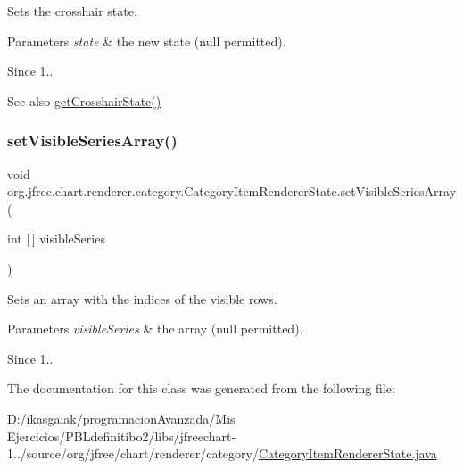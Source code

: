 Sets the crosshair state.


\begin{DoxyParams}{Parameters}
{\em state} & the new state ({\ttfamily null} permitted).\\
\hline
\end{DoxyParams}
\begin{DoxySince}{Since}
1..
\end{DoxySince}
\begin{DoxySeeAlso}{See also}
\mbox{\hyperlink{classorg_1_1jfree_1_1chart_1_1renderer_1_1category_1_1_category_item_renderer_state_a1643863db46b2b247a24e7d297b512e1}{get\+Crosshair\+State()}} 
\end{DoxySeeAlso}
\mbox{\label{classorg_1_1jfree_1_1chart_1_1renderer_1_1category_1_1_category_item_renderer_state_a2d5383dca6367b725a2de2c0f18c8fa3}} 
\subsubsection{\texorpdfstring{set\+Visible\+Series\+Array()}{setVisibleSeriesArray()}}
{\footnotesize\ttfamily void org.\+jfree.\+chart.\+renderer.\+category.\+Category\+Item\+Renderer\+State.\+set\+Visible\+Series\+Array (\begin{DoxyParamCaption}\item[{int \mbox{[}$\,$\mbox{]}}]{visible\+Series }\end{DoxyParamCaption})}

Sets an array with the indices of the visible rows.


\begin{DoxyParams}{Parameters}
{\em visible\+Series} & the array ({\ttfamily null} permitted).\\
\hline
\end{DoxyParams}
\begin{DoxySince}{Since}
1.. 
\end{DoxySince}


The documentation for this class was generated from the following file\+:\begin{DoxyCompactItemize}
\item 
D\+:/ikasgaiak/programacion\+Avanzada/\+Mis Ejercicios/\+P\+B\+Ldefinitibo2/libs/jfreechart-\/1../source/org/jfree/chart/renderer/category/\mbox{\hyperlink{_category_item_renderer_state_8java}{Category\+Item\+Renderer\+State.\+java}}\end{DoxyCompactItemize}
